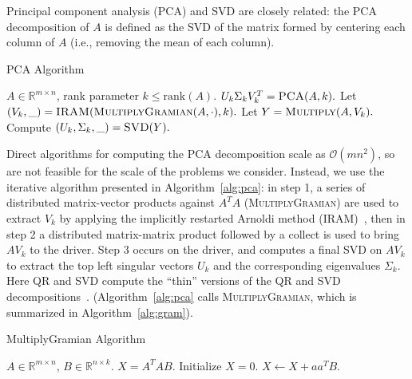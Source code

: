 Principal component analysis (PCA) and SVD are closely related: the PCA decomposition of $A$ is defined as the SVD of the matrix formed by centering each column of $A$ (i.e., removing the mean of each column).

\begin{algorithm}[tb]
    \caption{\textsc{PCA} Algorithm}
    \label{alg:pca}
    \begin{algorithmic}[1]
      \Require $A \in \mathbb{R}^{m\times n}$, rank parameter $k \leq \textrm{rank}(A).$
      \Ensure $U_k \Sigma_k V_k^T = \textsc{PCA}(A, k).$
      \State Let $(V_k, \_) = \textsc{IRAM}(\textsc{MultiplyGramian}(A, \cdot), k).$
      \State Let $Y = \textsc{Multiply}(A, V_k).$
      \State Compute $(U_k, \Sigma_k, \_) = \textsc{SVD}(Y).$
    \end{algorithmic}
  \end{algorithm}
  
Direct algorithms for computing the PCA decomposition scale as $\mathcal{O}(mn^2)$, so are not feasible for the scale of the problems we consider. Instead, we use the iterative algorithm presented in Algorithm~\ref{alg:pca}: in step 1, a series of distributed matrix-vector products against $A^T A$  (\textsc{MultiplyGramian}) are used to extract $V_k$ by applying the implicitly restarted Arnoldi method (\textsc{IRAM})~\cite{lehoucq1996deflation}, then in step 2 a distributed matrix-matrix product followed by a collect is used to bring $AV_k$ to the driver. Step 3 occurs on the driver, and computes a final SVD on $AV_k$ to extract the top left singular vectors $U_k$ and the corresponding eigenvalues $\Sigma_k.$ Here QR and SVD compute the ``thin'' versions of the QR and SVD decompositions~\cite{GVL96}. (Algorithm~\ref{alg:pca} calls \textsc{MultiplyGramian}, which is summarized in Algorithm~\ref{alg:gram}).

  \begin{algorithm}[tb]
    \caption{{\sc MultiplyGramian} Algorithm}
    \label{alg:gram}
    \begin{algorithmic}[1]
      \Require $A \in \mathbb{R}^{m\times n}$, $B \in \mathbb{R}^{n\times k}$.
      \Ensure $X = A^T A B$.
      \State Initialize $X = 0$.
          \State $X \gets X + a a^T B$.
      \EndFor
    \end{algorithmic}
\end{algorithm}
  
